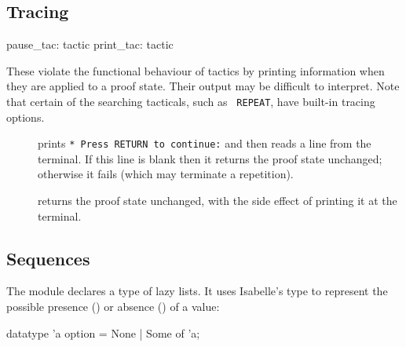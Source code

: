 \subsection{Tracing}
\begin{ttbox} 
pause_tac: tactic
print_tac: tactic
\end{ttbox}
These violate the functional behaviour of tactics by printing information
when they are applied to a proof state.  Their output may be difficult to
interpret.  Note that certain of the searching tacticals, such as {\tt
REPEAT}, have built-in tracing options.
\begin{description}
\item[] 
prints {\tt** Press RETURN to continue:} and then reads a line from the
terminal.  If this line is blank then it returns the proof state unchanged;
otherwise it fails (which may terminate a repetition).

\item[] 
returns the proof state unchanged, with the side effect of printing it at
the terminal.
\end{description}


\subsection{Sequences}
The module  declares a type of lazy lists.  It uses
Isabelle's type  to represent the possible presence
() or absence () of
a value:
\begin{ttbox}
datatype 'a option = None  |  Some of 'a;
\end{ttbox}

